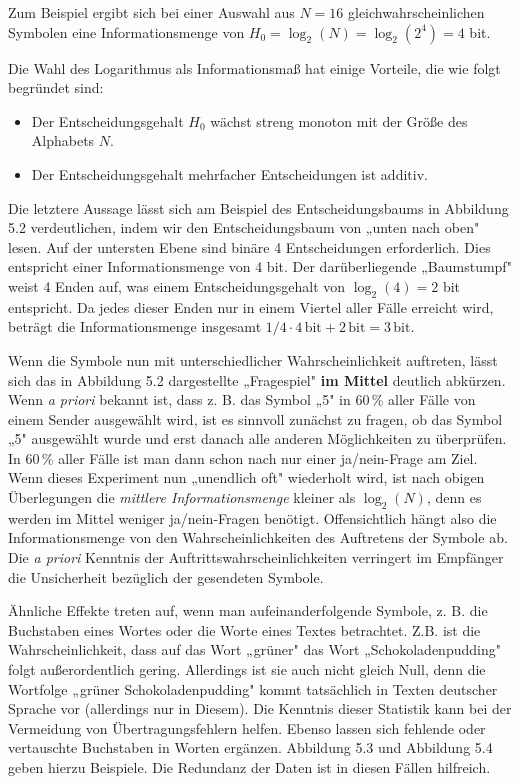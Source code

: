Zum Beispiel ergibt sich bei einer Auswahl aus $N = 16$ gleichwahrscheinlichen Symbolen eine Informationsmenge von $H_0 = \log_2(N) = \log_2(2^4) = 4$ bit.

Die Wahl des Logarithmus als Informationsmaß hat einige Vorteile, die wie folgt begründet sind:

\begin{itemize}
  \item Der Entscheidungsgehalt $H_0$ wächst streng monoton mit der Größe des Alphabets $N$.
  \item Der Entscheidungsgehalt mehrfacher Entscheidungen ist additiv.
\end{itemize}

Die letztere Aussage lässt sich am Beispiel des Entscheidungsbaums in Abbildung 5.2 verdeutlichen, indem wir den Entscheidungsbaum von „unten nach oben" lesen. Auf der untersten Ebene sind binäre 4 Entscheidungen erforderlich. Dies entspricht einer Informationsmenge von 4 bit. Der darüberliegende „Baumstumpf" weist 4 Enden auf, was einem Entscheidungsgehalt von $\log_2(4) = 2$ bit entspricht. Da jedes dieser Enden nur in einem Viertel aller Fälle erreicht wird, beträgt die Informationsmenge insgesamt $1/4 \cdot 4\,\text{bit} + 2\,\text{bit} = 3\,\text{bit}$.

Wenn die Symbole nun mit unterschiedlicher Wahrscheinlichkeit auftreten, lässt sich das in Abbildung 5.2 dargestellte „Fragespiel" \textbf{im Mittel} deutlich abkürzen. Wenn \textit{a priori} bekannt ist, dass z. B. das Symbol „5" in 60\,\% aller Fälle von einem Sender ausgewählt wird, ist es sinnvoll zunächst zu fragen, ob das Symbol „5" ausgewählt wurde und erst danach alle anderen Möglichkeiten zu überprüfen. In 60\,\% aller Fälle ist man dann schon nach nur einer ja/nein-Frage am Ziel. Wenn dieses Experiment nun „unendlich oft" wiederholt wird, ist nach obigen Überlegungen die \textit{mittlere Informationsmenge} kleiner als $\log_2(N)$, denn es werden im Mittel weniger ja/nein-Fragen benötigt. Offensichtlich hängt also die Informationsmenge von den Wahrscheinlichkeiten des Auftretens der Symbole ab. Die \textit{a priori} Kenntnis der Auftrittswahrscheinlichkeiten verringert im Empfänger die Unsicherheit bezüglich der gesendeten Symbole.

Ähnliche Effekte treten auf, wenn man aufeinanderfolgende Symbole, z. B. die Buchstaben eines Wortes oder die Worte eines Textes betrachtet. Z.B. ist die Wahrscheinlichkeit, dass auf das Wort „grüner" das Wort „Schokoladenpudding" folgt außerordentlich gering. Allerdings ist sie auch nicht gleich Null, denn die Wortfolge „grüner Schokoladenpudding" kommt tatsächlich in Texten deutscher Sprache vor (allerdings nur in Diesem). Die Kenntnis dieser Statistik kann bei der Vermeidung von Übertragungsfehlern helfen. Ebenso lassen sich fehlende oder vertauschte Buchstaben in Worten ergänzen. Abbildung 5.3 und Abbildung 5.4 geben hierzu Beispiele. Die Redundanz der Daten ist in diesen Fällen hilfreich.

